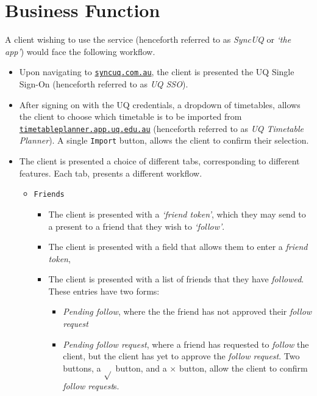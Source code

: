\documentclass[11pt,a4paper]{report}
\begin{document}
\section{Business Function}

A client wishing to use the service (henceforth referred to as \textit{SyncUQ} or \textit{`the app'}) would face the following workflow.

\begin{itemize}
    \item Upon navigating to \href{http://www.syncuq.com.au/}{\texttt{syncuq.com.au}}, the client is presented the UQ Single Sign-On (henceforth referred to as \textit{UQ SSO}).
    \item After signing on with the UQ credentials, a dropdown of timetables, allows the client to choose which timetable is to be imported from \href{http://timetableplanner.app.uq.edu.au/}{\texttt{timetableplanner.app.uq.edu.au}} (henceforth referred to as \textit{UQ Timetable Planner}). A single \texttt{Import} button, allows the client to confirm their selection.
    \item The client is presented a choice of different tabs, corresponding to different features. Each tab, presents a different workflow.
        \begin{itemize}
            \item \texttt{Friends}
                \begin{itemize}
                    \item The client is presented with a \textit{`friend token'}, which they may send to a present to a friend that they wish to \textit{`follow'}.
                    \item The client is presented with a field that allows them to enter a \textit{friend token}, 
                    \item The client is presented with a list of friends that they have \textit{followed}. These entries have two forms: 
                        \begin{itemize}
                            \item \textit{Pending follow}, where the the friend has not approved their \textit{follow request}
                            \item \textit{Pending follow request}, where a friend has requested to \textit{follow} the client, but the client has yet to approve the \textit{follow request}. Two buttons, a $\sqrt{}$ button, and a $\times$ button, allow the client to confirm \textit{follow request}s.

\end{itemize}
\end{itemize}
\end{itemize}
\end{itemize}
\end{document}
